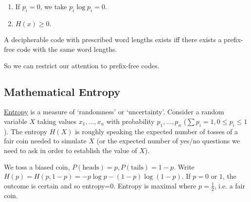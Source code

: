 \documentclass{article}
\begin{document}

\begin{remark}
    \leavevmode
    \begin{enumerate}[label=(\roman*)]
        \item If $p_i = 0$, we take $p_i \log p_i=0$.
        \item $H(x) \geq 0$.
    \end{enumerate}
\end{remark}

\begin{cor}
    A decipherable code with prescribed word lengths exists iff there exists a prefix-free code with the same word lengths.
\end{cor}
So we can restrict our attention to prefix-free codes.

\subsection{Mathematical Entropy}
\hyperlink{def:entropy}{Entropy} is a measure of `randomness' or `uncertainty'.
Consider a random variable $X$ taking values $x_1, \dotsc, x_n$ with probability $p_1, \dotsc, p_n$ ($\sum p_i = 1, 0 \leq p_i \leq 1$).
The entropy $H(X)$ is roughly speaking the expected number of tosses of a fair coin needed to simulate $X$ (or the expected number of yes/no questions we need to ask in order to establish the value of $X$).

\begin{eg}
    We toss a biased coin, $P(\text{heads}) = p, P(\text{tails}) = 1-p$. Write $H(p) = H(p, 1-p) = -p \log p - (1-p) \log (1-p)$.
    If $p=0$ or $1$, the outcome is certain and so entropy=0. Entropy is maximal where $p=\frac{1}{2}$, i.e. a fair coin.

    \begin{center}
    \end{center}
\end{eg}
\end{document}
